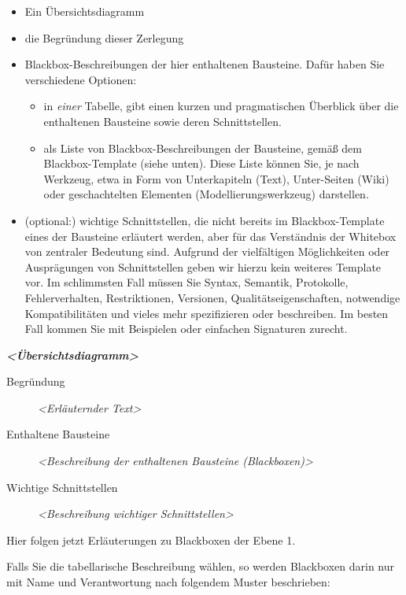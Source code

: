 \documentclass[]{article}
\begin{document}
\begin{itemize}
\item
  Ein Übersichtsdiagramm
\item
  die Begründung dieser Zerlegung
\item
  Blackbox-Beschreibungen der hier enthaltenen Bausteine. Dafür haben
  Sie verschiedene Optionen:

  \begin{itemize}
  \item
    in \emph{einer} Tabelle, gibt einen kurzen und pragmatischen
    Überblick über die enthaltenen Bausteine sowie deren Schnittstellen.
  \item
    als Liste von Blackbox-Beschreibungen der Bausteine, gemäß dem
    Blackbox-Template (siehe unten). Diese Liste können Sie, je nach
    Werkzeug, etwa in Form von Unterkapiteln (Text), Unter-Seiten (Wiki)
    oder geschachtelten Elementen (Modellierungswerkzeug) darstellen.
  \end{itemize}
\item
  (optional:) wichtige Schnittstellen, die nicht bereits im
  Blackbox-Template eines der Bausteine erläutert werden, aber für das
  Verständnis der Whitebox von zentraler Bedeutung sind. Aufgrund der
  vielfältigen Möglichkeiten oder Ausprägungen von Schnittstellen geben
  wir hierzu kein weiteres Template vor. Im schlimmsten Fall müssen Sie
  Syntax, Semantik, Protokolle, Fehlerverhalten, Restriktionen,
  Versionen, Qualitätseigenschaften, notwendige Kompatibilitäten und
  vieles mehr spezifizieren oder beschreiben. Im besten Fall kommen Sie
  mit Beispielen oder einfachen Signaturen zurecht.
\end{itemize}

\emph{\textbf{\textless{}Übersichtsdiagramm\textgreater{}}}

\begin{description}
\item[Begründung]
\emph{\textless{}Erläuternder Text\textgreater{}}
\item[Enthaltene Bausteine]
\emph{\textless{}Beschreibung der enthaltenen Bausteine
(Blackboxen)\textgreater{}}
\item[Wichtige Schnittstellen]
\emph{\textless{}Beschreibung wichtiger Schnittstellen\textgreater{}}
\end{description}

Hier folgen jetzt Erläuterungen zu Blackboxen der Ebene 1.

Falls Sie die tabellarische Beschreibung wählen, so werden Blackboxen
darin nur mit Name und Verantwortung nach folgendem Muster beschrieben:
\end{document}
